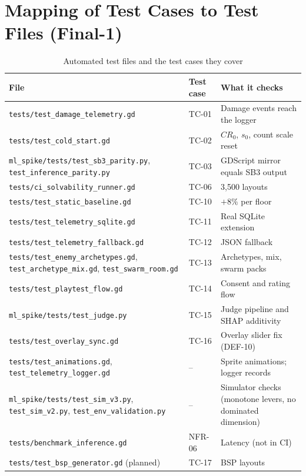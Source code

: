 \section{Mapping of Test Cases to Test Files (Final-1)}
\begin{table}[!htbp]
\centering
\caption{Automated test files and the test cases they cover}
\label{tab:test_files}
\scriptsize
\begin{tabular}{p{}p{}p{}}
\toprule
\textbf{File} & \textbf{Test case} & \textbf{What it checks} \\
\midrule
\texttt{tests/test\_damage\_telemetry.gd} & TC-01 & Damage events reach the logger \\
\texttt{tests/test\_cold\_start.gd} & TC-02 & $CR_0$, $s_0$, count scale reset \\
\texttt{ml\_spike/tests/test\_sb3\_parity.py}, \texttt{test\_inference\_parity.py} & TC-03 & GDScript mirror equals SB3 output \\
\texttt{tests/ci\_solvability\_runner.gd} & TC-06 & 3,500 layouts \\
\texttt{tests/test\_static\_baseline.gd} & TC-10 & $+8\%$ per floor \\
\texttt{tests/test\_telemetry\_sqlite.gd} & TC-11 & Real SQLite extension \\
\texttt{tests/test\_telemetry\_fallback.gd} & TC-12 & JSON fallback \\
\texttt{tests/test\_enemy\_archetypes.gd}, \texttt{test\_archetype\_mix.gd}, \texttt{test\_swarm\_room.gd} & TC-13 & Archetypes, mix, swarm packs \\
\texttt{tests/test\_playtest\_flow.gd} & TC-14 & Consent and rating flow \\
\texttt{ml\_spike/tests/test\_judge.py} & TC-15 & Judge pipeline and SHAP additivity \\
\texttt{tests/test\_overlay\_sync.gd} & TC-16 & Overlay slider fix (DEF-10) \\
\texttt{tests/test\_animations.gd}, \texttt{test\_telemetry\_logger.gd} & -- & Sprite animations; logger records \\
\texttt{ml\_spike/tests/test\_sim\_v3.py}, \texttt{test\_sim\_v2.py}, \texttt{test\_env\_validation.py} & -- & Simulator checks (monotone levers, no dominated dimension) \\
\texttt{tests/benchmark\_inference.gd} & NFR-06 & Latency (not in CI) \\
\texttt{tests/test\_bsp\_generator.gd} (planned) & TC-17 & BSP layouts \\
\bottomrule
\end{tabular}
\end{table}
